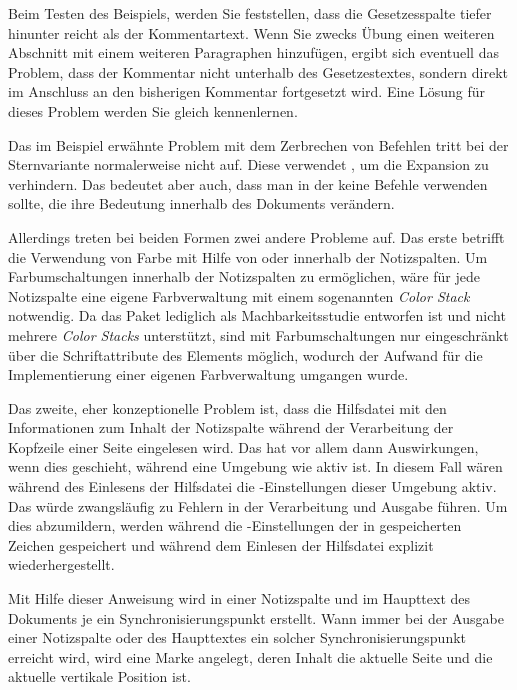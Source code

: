 Beim Testen des Beispiels, werden Sie feststellen, dass die Gesetzes\-spalte
tiefer hinunter reicht als der Kommentartext. Wenn Sie
zwecks Übung einen weiteren Abschnitt mit einem weiteren Paragraphen
hinzufügen, ergibt sich eventuell das Problem, dass der Kommentar nicht
unterhalb des Gesetzestextes, sondern direkt im Anschluss an den bisherigen
Kommentar fortgesetzt wird. Eine Lösung für dieses Problem werden Sie gleich
kennenlernen.

Das im Beispiel erwähnte
Problem mit dem Zerbrechen von Befehlen tritt bei der
Sternvariante normalerweise nicht auf. Diese
verwendet , um die Expansion zu verhindern. Das bedeutet
aber auch, dass man in der  keine Befehle verwenden sollte, die
ihre Bedeutung innerhalb des Dokuments verändern.

Allerdings treten bei beiden Formen zwei andere Probleme
auf. Das erste betrifft die Verwendung von Farbe mit Hilfe von
 oder 
innerhalb der Notizspalten. Um Farbumschaltungen innerhalb der Notizspalten zu
ermöglichen, wäre für jede Notizspalte eine eigene Farbverwaltung mit einem
sogenannten \emph{Color Stack} notwendig. Da das Paket lediglich als
Machbarkeitsstudie entworfen ist und \XeTeX{} nicht mehrere \emph{Color
  Stacks} unterstützt, sind mit \XeTeX{} Farbumschaltungen nur eingeschränkt
über die Schriftattribute des Elements  möglich, wodurch der Aufwand für die Implementierung einer
eigenen Farbverwaltung umgangen wurde.

Das zweite, eher konzeptionelle Problem ist, dass die
Hilfsdatei mit den Informationen zum Inhalt der Notizspalte während der
Verarbeitung der Kopfzeile einer Seite eingelesen wird. Das hat vor allem dann
Auswirkungen, wenn dies geschieht, während eine Umgebung wie
 aktiv ist. In diesem Fall wären während des Einlesens
der Hilfsdatei die -Einstellungen dieser Umgebung aktiv. Das
würde zwangsläufig zu Fehlern in der Verarbeitung und Ausgabe führen. Um dies
abzumildern, werden während  die
-Einstellungen der in 
gespeicherten Zeichen gespeichert und während dem Einlesen der Hilfsdatei
explizit wiederhergestellt.%
\EndIndexGroup


\begin{Declaration}
\end{Declaration}
Mit Hilfe dieser Anweisung wird in einer Notizspalte und im Haupttext des
Dokuments je ein
Synchronisierungspunkt
erstellt. Wann immer bei der Ausgabe einer Notizspalte oder des Haupttextes
ein solcher Synchronisierungspunkt erreicht wird, wird eine Marke angelegt,
deren Inhalt die aktuelle Seite und die aktuelle vertikale Position ist.

